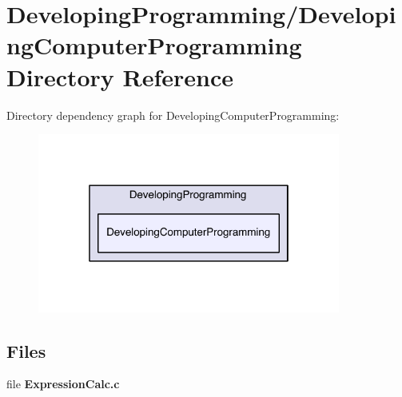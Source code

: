 \section{Developing\+Programming/\+Developing\+Computer\+Programming Directory Reference}
\label{dir_258e67951ec83efcfde3d9dde1a87b64}
Directory dependency graph for Developing\+Computer\+Programming\+:
\nopagebreak
\begin{figure}[H]
\begin{center}
\leavevmode
\includegraphics[width=282pt]{dir_258e67951ec83efcfde3d9dde1a87b64_dep}
\end{center}
\end{figure}
\subsection*{Files}
\begin{DoxyCompactItemize}
\item 
file {\bf Expression\+Calc.\+c}
\end{DoxyCompactItemize}
